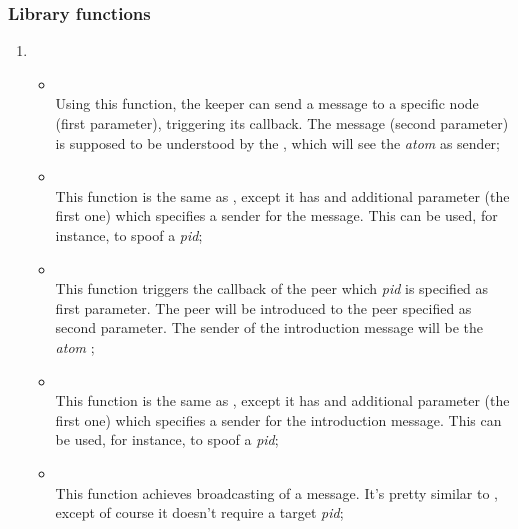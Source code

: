     \subsubsection{Library functions}

        \begin{enumerate}
        \item   {}

            \begin{itemize}

            \item {} \\
                Using this function, the keeper can send a message to a
                specific node (first parameter), triggering its
                 callback. The message
                (second parameter) is supposed to be understood by the
                , which will see the \emph{atom}
                 as sender;

            \item {} \\
                This function is the same as , except it has
                and additional parameter (the first one) which specifies a
                sender for the message. This can be used, for instance, to
                spoof a \emph{pid};

            \item {} \\
                This function triggers the 
                callback of the peer which \emph{pid} is specified as
                first parameter. The peer will be introduced to the peer
                specified as second parameter. The sender of the
                introduction message will be the \emph{atom}
                ;

            \item {} \\
                This function is the same as , except
                it has and additional parameter (the first one) which
                specifies a sender for the introduction message. This can
                be used, for instance, to spoof a \emph{pid};

            \item {} \\
                This function achieves broadcasting of a message. It's
                pretty similar to , except of course it
                doesn't require a target \emph{pid};


\end{itemize}
\end{enumerate}
